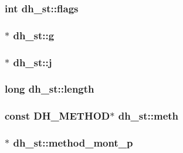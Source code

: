 \subsubsection[{\texorpdfstring{flags}{flags}}]{\setlength{\rightskip}{0pt plus 5cm}int dh\+\_\+st\+::flags}\hypertarget{structdh__st_a6edfd86d7930e5a1c3708f822c9b2680}{}\label{structdh__st_a6edfd86d7930e5a1c3708f822c9b2680}
\subsubsection[{\texorpdfstring{g}{g}}]{$\ast$ dh\+\_\+st\+::g}\hypertarget{structdh__st_aa4bceea00e97aad49a2fd04b0e552f4f}{}\label{structdh__st_aa4bceea00e97aad49a2fd04b0e552f4f}
\subsubsection[{\texorpdfstring{j}{j}}]{$\ast$ dh\+\_\+st\+::j}\hypertarget{structdh__st_af6140cb07291cd40b23442d1466ec114}{}\label{structdh__st_af6140cb07291cd40b23442d1466ec114}
\subsubsection[{\texorpdfstring{length}{length}}]{\setlength{\rightskip}{0pt plus 5cm}long dh\+\_\+st\+::length}\hypertarget{structdh__st_ac1a24166e9a30f03bd66fcd8713e560f}{}\label{structdh__st_ac1a24166e9a30f03bd66fcd8713e560f}
\subsubsection[{\texorpdfstring{meth}{meth}}]{\setlength{\rightskip}{0pt plus 5cm}const {\bf D\+H\+\_\+\+M\+E\+T\+H\+OD}$\ast$ dh\+\_\+st\+::meth}\hypertarget{structdh__st_ae98dc2f23940781bceeb2b4cb931a2a3}{}\label{structdh__st_ae98dc2f23940781bceeb2b4cb931a2a3}
\subsubsection[{\texorpdfstring{method\+\_\+mont\+\_\+p}{method_mont_p}}]{$\ast$ dh\+\_\+st\+::method\+\_\+mont\+\_\+p}\hypertarget{structdh__st_a2c49ea291e7d1b359a944e3d807a842f}{}\label{structdh__st_a2c49ea291e7d1b359a944e3d807a842f}
